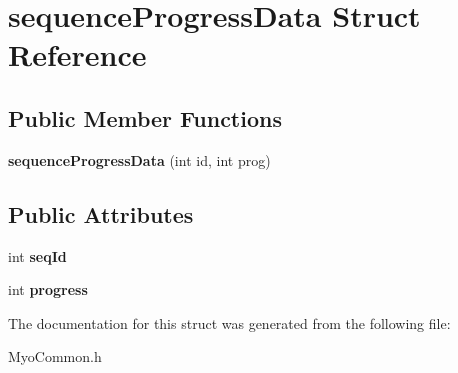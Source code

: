 \hypertarget{structsequence_progress_data}{\section{sequence\+Progress\+Data Struct Reference}
\label{structsequence_progress_data}
}
\subsection*{Public Member Functions}
\begin{DoxyCompactItemize}
\item 
\hypertarget{structsequence_progress_data_aff3ad5730a32774f1ba123b5df847b41}{{\bfseries sequence\+Progress\+Data} (int id, int prog)}\label{structsequence_progress_data_aff3ad5730a32774f1ba123b5df847b41}

\end{DoxyCompactItemize}
\subsection*{Public Attributes}
\begin{DoxyCompactItemize}
\item 
\hypertarget{structsequence_progress_data_a3692ee9b7a74dadaaa6efdc65113b70c}{int {\bfseries seq\+Id}}\label{structsequence_progress_data_a3692ee9b7a74dadaaa6efdc65113b70c}

\item 
\hypertarget{structsequence_progress_data_a4c144a4db3f71c86845962239c3f61b3}{int {\bfseries progress}}\label{structsequence_progress_data_a4c144a4db3f71c86845962239c3f61b3}

\end{DoxyCompactItemize}


The documentation for this struct was generated from the following file\+:\begin{DoxyCompactItemize}
\item 
Myo\+Common.\+h\end{DoxyCompactItemize}
